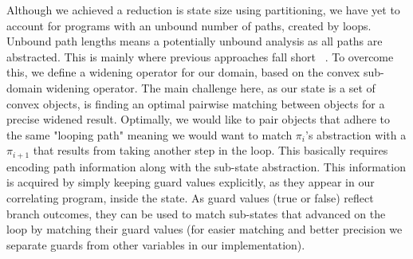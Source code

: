 

Although we achieved a reduction is state size using partitioning, we have yet to account for programs with an unbound number of paths, created by loops. Unbound path lengths means a potentially unbound analysis as all paths are abstracted. This is mainly where previous approaches fall short ~\cite{GodlinStrichman09, KawaguchiLahiriRebelo10, DwyerElbaumPerson08, EnglerRamos11}. To overcome this, we define a widening operator for our domain, based on the convex sub-domain widening operator. The main challenge here, as our state is a set of convex objects, is finding an optimal pairwise matching between objects for a precise widened result. Optimally, we would like to pair objects that adhere to the same "looping path" meaning we would want to match $\pi_i$'s abstraction with a $\pi_{i+1}$ that results from taking another step in the loop. This basically requires encoding path information along with the sub-state abstraction. This information is acquired by simply keeping guard values explicitly, as they appear in our correlating program, inside the state. As guard values (true or false) reflect branch outcomes, they can be used to match sub-states that advanced on the loop by matching their guard values (for easier matching and better precision we separate guards from other variables in our implementation).



